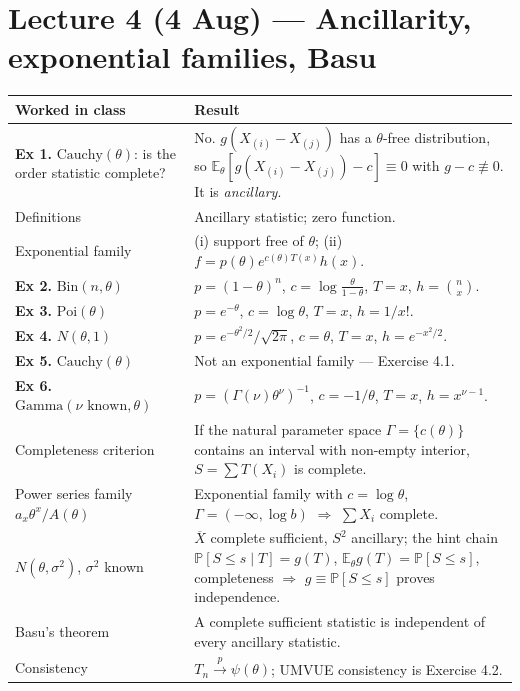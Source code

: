 \documentclass[11pt]{article}
\newcommand{\E}{\mathbb{E}}
\newcommand{\Prob}{\mathbb{P}}
\newcommand{\Xbar}{\overline{X}}
\newcommand{\pto}{\overset{p}{\longrightarrow}}
\begin{document}
\section*{Lecture 4 (4 Aug) --- Ancillarity, exponential families, Basu}
\begin{longtable}{@{}p{7.2cm}p{9.0cm}@{}}
\toprule
\textbf{Worked in class} & \textbf{Result} \\
\midrule
\textbf{Ex 1.} $\mathrm{Cauchy}(\theta)$: is the order statistic complete? &
No. $g(X_{(i)}-X_{(j)})$ has a $\theta$-free distribution, so
$\E_\theta[g(X_{(i)}-X_{(j)})-c]\equiv0$ with $g-c\not\equiv0$. It is \emph{ancillary}. \\
Definitions & Ancillary statistic; zero function. \\
Exponential family & (i) support free of $\theta$; (ii) $f=p(\theta)e^{c(\theta)T(x)}h(x)$. \\
\textbf{Ex 2.} $\mathrm{Bin}(n,\theta)$ &
$p=(1-\theta)^n$, $c=\log\tfrac{\theta}{1-\theta}$, $T=x$, $h=\binom nx$. \\
\textbf{Ex 3.} $\mathrm{Poi}(\theta)$ & $p=e^{-\theta}$, $c=\log\theta$, $T=x$, $h=1/x!$. \\
\textbf{Ex 4.} $N(\theta,1)$ & $p=e^{-\theta^2/2}/\sqrt{2\pi}$, $c=\theta$, $T=x$, $h=e^{-x^2/2}$. \\
\textbf{Ex 5.} $\mathrm{Cauchy}(\theta)$ & Not an exponential family --- Exercise 4.1. \\
\textbf{Ex 6.} $\mathrm{Gamma}(\nu\text{ known},\theta)$ &
$p=(\Gamma(\nu)\theta^\nu)^{-1}$, $c=-1/\theta$, $T=x$, $h=x^{\nu-1}$. \\
Completeness criterion &
If the natural parameter space $\Gamma=\{c(\theta)\}$ contains an interval with non-empty
interior, $S=\sum T(X_i)$ is complete. \\
Power series family $a_x\theta^x/A(\theta)$ &
Exponential family with $c=\log\theta$, $\Gamma=(-\infty,\log b)$ $\Rightarrow$ $\sum X_i$
complete. \\
$N(\theta,\sigma^2)$, $\sigma^2$ known &
$\Xbar$ complete sufficient, $S^2$ ancillary; the hint chain
$\Prob[S\le s\mid T]=g(T)$, $\E_\theta g(T)=\Prob[S\le s]$, completeness $\Rightarrow$
$g\equiv\Prob[S\le s]$ proves independence. \\
Basu's theorem &
A complete sufficient statistic is independent of every ancillary statistic. \\
Consistency & $T_n\pto\psi(\theta)$; UMVUE consistency is Exercise 4.2. \\
\bottomrule
\end{longtable}
\end{document}
